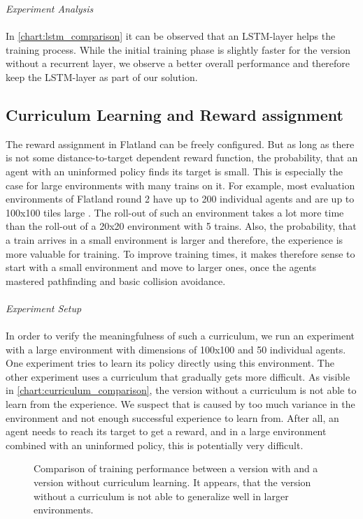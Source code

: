 \textit{Experiment Analysis}\\\\
In \autoref{chart:lstm_comparison} it can be observed that an LSTM-layer helps the training process. While the initial training phase is slightly faster for the version without a recurrent layer, we observe a better overall performance and therefore keep the LSTM-layer as part of our solution.

\subsection*{Curriculum Learning and Reward assignment}\label{curriculum_learning}
The reward assignment in Flatland can be freely configured. But as long as there is not some distance-to-target dependent reward function, the probability, that an agent with an uninformed policy finds its target is small. This is especially the case for large environments with many trains on it. For example, most evaluation environments of Flatland round 2 have up to 200 individual agents and are up to 100x100 tiles large \cite{flatland_faq}. The roll-out of such an environment takes a lot more time than the roll-out of a 20x20 environment with 5 trains. Also, the probability, that a train arrives in a small environment is larger and therefore, the experience is more valuable for training.
To improve training times, it makes therefore sense to start with a small environment and move to larger ones, once the agents mastered pathfinding and basic collision avoidance.\\\\
\textit{Experiment Setup}\\\\
In order to verify the meaningfulness of such a curriculum, we run an experiment with a large environment with dimensions of 100x100 and 50 individual agents. One experiment tries to learn its policy directly using this environment. The other experiment uses a curriculum that gradually gets more difficult.
As visible in \autoref{chart:curriculum_comparison}, the version without a curriculum is not able to learn from the experience. We suspect that is caused by too much variance in the environment and not enough successful experience to learn from. After all, an agent needs to reach its target to get a reward, and in a large environment combined with an uninformed policy, this is potentially very difficult.
\begin{figure}[H]
	\begin{center}
		
	\end{center}
	\caption{Comparison of training performance between a version with and a version without curriculum learning. It appears, that the version without a curriculum is not able to generalize well in larger environments.}
	\label{chart:curriculum_comparison}
\end{figure}
